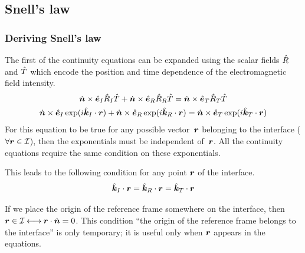 \subsection{Snell's law}
\label{sec:snells_law}

\subsubsection{Deriving Snell's law}
The first of the continuity equations can be expanded using the scalar fields $\hat{R}$ and $\hat{T}$ which encode the position and time dependence of the electromagnetic field intensity.
\begin{subequations}
    \begin{gather}
        \dot{\bm{n}} \times \hat{\bm{e}}_I \hat{R}_I \hat{T} +
        \dot{\bm{n}} \times \hat{\bm{e}}_R \hat{R}_R \hat{T}=
        \dot{\bm{n}} \times \hat{\bm{e}}_T \hat{R}_T \hat{T}
        \\
        \dot{\bm{n}} \times \hat{\bm{e}}_I \exp(i \hat{\bm{k}}_I \cdot \bm{r}) +
        \dot{\bm{n}} \times \hat{\bm{e}}_R \exp(i \hat{\bm{k}}_R \cdot \bm{r}) =
        \dot{\bm{n}} \times \hat{\bm{e}}_T \exp(i \hat{\bm{k}}_T \cdot \bm{r})
    \end{gather}
\end{subequations}
For this equation to be true for any possible vector~$\bm{r}$ belonging to the interface
($\forall \bm{r} \in \mathcal{I}$), then the exponentials must be independent of~$\bm{r}$.
All the continuity equations require the same condition on these exponentials.

This leads to the following condition for any point $\bm{r}$ of the interface.
\begin{equation}
    \hat{\bm{k}}_I \cdot \bm{r} =
    \hat{\bm{k}}_R \cdot \bm{r} =
    \hat{\bm{k}}_T \cdot \bm{r}
\end{equation}

If we place the origin of the reference frame somewhere on the interface,
then $\bm{r} \in \mathcal{I} \mathbin{\longleftrightarrow} \bm{r} \cdot \dot{\bm{n}}=0$.
This condition ``the origin of the reference frame belongs to the interface'' is only temporary; it is useful only when $\bm{r}$ appears in the equations.

